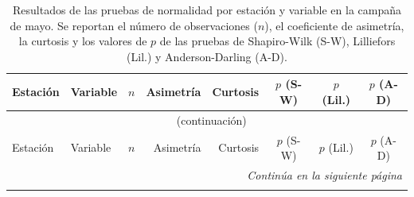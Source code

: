 \begin{longtable}{@{}llrrrccc@{}}
\caption{Resultados de las pruebas de normalidad por estación y variable en la campaña de mayo. Se reportan el número de observaciones ($n$), el coeficiente de asimetría, la curtosis y los valores de $p$ de las pruebas de Shapiro-Wilk (S-W), Lilliefors (Lil.) y Anderson-Darling (A-D).}
\label{tab:normalidad_may}\\
\toprule
Estación & Variable & $n$ & Asimetría & Curtosis & $p$ (S-W) & $p$ (Lil.) & $p$ (A-D) \\
\midrule
\endfirsthead

\multicolumn{8}{c}{\tablename~\thetable{} (continuación)}\\
\toprule
Estación & Variable & $n$ & Asimetría & Curtosis & $p$ (S-W) & $p$ (Lil.) & $p$ (A-D) \\
\midrule
\endhead

\midrule
\multicolumn{8}{r}{\textit{Continúa en la siguiente página}}\\
\endfoot

\bottomrule
\endlastfoot


\end{longtable}
